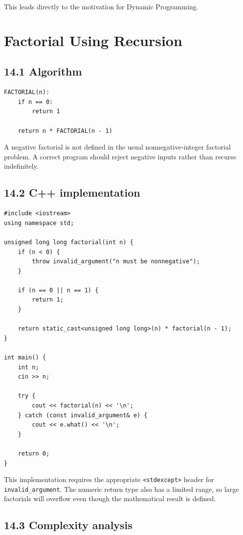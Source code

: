 This leads directly to the motivation for Dynamic Programming.

\section{Factorial Using Recursion}

\subsection{14.1 Algorithm}

\begin{lstlisting}[style=cppstyle]
FACTORIAL(n):
    if n == 0:
        return 1

    return n * FACTORIAL(n - 1)
\end{lstlisting}

A negative factorial is not defined in the usual nonnegative-integer factorial problem. A correct program should reject negative inputs rather than recurse indefinitely.

\subsection{14.2 C++ implementation}

\begin{lstlisting}[style=cppstyle]
#include <iostream>
using namespace std;

unsigned long long factorial(int n) {
    if (n < 0) {
        throw invalid_argument("n must be nonnegative");
    }

    if (n == 0 || n == 1) {
        return 1;
    }

    return static_cast<unsigned long long>(n) * factorial(n - 1);
}

int main() {
    int n;
    cin >> n;

    try {
        cout << factorial(n) << '\n';
    } catch (const invalid_argument& e) {
        cout << e.what() << '\n';
    }

    return 0;
}
\end{lstlisting}

This implementation requires the appropriate \texttt{<stdexcept>} header for \texttt{invalid\_argument}. The numeric return type also has a limited range, so large factorials will overflow even though the mathematical result is defined.

\subsection{14.3 Complexity analysis}

